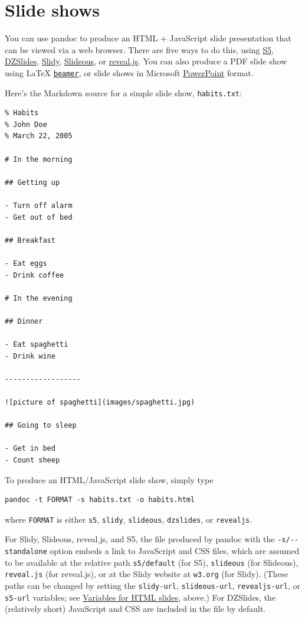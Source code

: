 \documentclass[
  b5paper
]{book}
\begin{document}
\chapter{Slide shows}\label{slide-shows}

You can use pandoc to produce an HTML + JavaScript slide presentation
that can be viewed via a web browser. There are five ways to do this,
using \href{https://meyerweb.com/eric/tools/s5/}{S5},
\href{https://paulrouget.com/dzslides/}{DZSlides},
\href{https://www.w3.org/Talks/Tools/Slidy2/}{Slidy},
\href{https://goessner.net/articles/slideous/}{Slideous}, or
\href{https://revealjs.com/}{reveal.js}. You can also produce a PDF
slide show using LaTeX
\href{https://ctan.org/pkg/beamer}{\texttt{beamer}}, or slide shows in
Microsoft
\href{https://en.wikipedia.org/wiki/Microsoft_PowerPoint}{PowerPoint}
format.

Here's the Markdown source for a simple slide show, \texttt{habits.txt}:

\begin{verbatim}
% Habits
% John Doe
% March 22, 2005

# In the morning

## Getting up

- Turn off alarm
- Get out of bed

## Breakfast

- Eat eggs
- Drink coffee

# In the evening

## Dinner

- Eat spaghetti
- Drink wine

------------------

![picture of spaghetti](images/spaghetti.jpg)

## Going to sleep

- Get in bed
- Count sheep
\end{verbatim}

To produce an HTML/JavaScript slide show, simply type

\begin{verbatim}
pandoc -t FORMAT -s habits.txt -o habits.html
\end{verbatim}

where \texttt{FORMAT} is either \texttt{s5}, \texttt{slidy},
\texttt{slideous}, \texttt{dzslides}, or \texttt{revealjs}.

For Slidy, Slideous, reveal.js, and S5, the file produced by pandoc with
the \texttt{-s/-\/-standalone} option embeds a link to JavaScript and
CSS files, which are assumed to be available at the relative path
\texttt{s5/default} (for S5), \texttt{slideous} (for Slideous),
\texttt{reveal.js} (for reveal.js), or at the Slidy website at
\texttt{w3.org} (for Slidy). (These paths can be changed by setting the
\texttt{slidy-url}, \texttt{slideous-url}, \texttt{revealjs-url}, or
\texttt{s5-url} variables; see
\hyperref[variables-for-html-slides]{Variables for HTML slides}, above.)
For DZSlides, the (relatively short) JavaScript and CSS are included in
the file by default.
\end{document}
